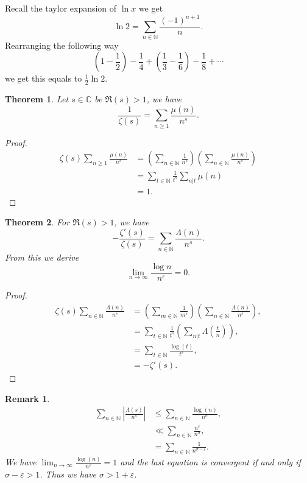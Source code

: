 \documentclass{article}
\newtheorem{theorem}{Theorem} [section]
\newtheorem{remark}{Remark}[section]
\newcommand{\N}[0]{\mathbb{N}}
\newcommand{\C}[0]{\mathbb{C}}
\begin{document}
Recall the taylor expansion of $\ln x$ we get 
\begin{equation*}
  \ln2 = \sum_{n\in\N} {\frac {(-1)^{n+1}} n}.
\end{equation*}
Rearranging the following way 
\begin{equation*}
  \left(1-{\frac 1 2}\right) -{\frac 1 4} + \left({\frac 1 3}-{\frac 1 6}\right)- {\frac 1 8}+\cdots
\end{equation*}
we get this equals to ${\frac 1 2 }\ln2$. 
\begin{theorem}
  Let $s\in\C$ be $\Re(s)>1$, we have 
  \begin{equation*}
    {\frac 1 {\zeta(s)}} = \sum_{n\geq 1}{\frac {\mu(n)} {n^s}}.
  \end{equation*}
  \label{theomre_zeta_inverse}
\end{theorem}
\begin{proof}
  \begin{align*}
    \zeta(s)\sum_{n\geq1}{\frac {\mu(n)} {n^s}} & = \left(\sum_{n\in\N}{\frac 1 {n^s}}\right)\left(\sum_{n\in\N}{\frac {\mu(n)} {n^s}}\right)\\
    & = \sum_{t\in\N}{\frac 1 {t^s}}\sum_{n|t}\mu(n)\\
    & = 1.
  \end{align*}  
\end{proof}
\begin{theorem}
  For $\Re(s)>1$, we have
  \begin{equation*}
    -{\frac {\zeta'(s)} {\zeta(s)}} = \sum_{n\in\N} {\frac {\Lambda(n)} {n^s}}.
  \end{equation*}
  From this we derive 
  \begin{equation*}
    \lim_{n\to\infty} {\frac {\log n} {n^\varepsilon}}=0.
  \end{equation*}
  \label{theorem_log_zeta_mangoldot}
\end{theorem}
\begin{proof}
  \begin{align*}
    \zeta(s)\sum_{n\in\N}{\frac {\Lambda(n)} {n^s}} & = \left(\sum_{m\in\N}{\frac 1 {m^s}}\right)\left(\sum_{n\in\N}{\frac {\Lambda(n)} {n^s}}\right),\\
    & = \sum_{t\in\N}{\frac 1 {t^s}}\left(\sum_{n|t}\Lambda\left({\frac t n}\right)\right),\\
    & = \sum_{t\in\N}{\frac {\log(t)} {t^s}},\\
    & = -\zeta'(s).
  \end{align*}
\end{proof}
\begin{remark}
  \begin{align*}
    \sum_{n\in\N} \left\vert{\frac {\Lambda(s)} {n^s}}\right\vert &\leq \sum_{n\in\N}{\frac {\log(n)} {n^\sigma}},\\
    &\ll \sum_{n\in\N}{\frac {n^\varepsilon} {n^\sigma}},\\
    & = \sum_{n\in\N}{\frac 1 {n^{\sigma-\varepsilon}}}.
  \end{align*}
  We have $\lim_{n\to\infty}{\frac {\log(n)} {n^\varepsilon}}=1$ and the last equation is convergent if and only if $\sigma-\varepsilon>1$. Thus we have $\sigma>1+\varepsilon$.
\end{remark}
\end{document}

